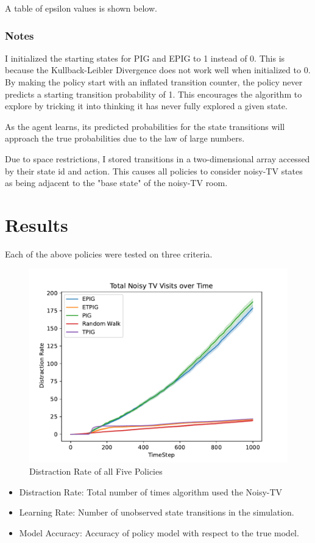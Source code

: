 \documentclass[12pt]{thesis}
\begin{document}
A table of epsilon values is shown below.
\subsection{Notes}
I initialized the starting states for PIG and EPIG to 1 instead of 0. This is because the Kullback-Leibler Divergence does not work well when initialized to 0. By making the policy start with an inflated transition counter, the policy never predicts a starting transition probability of 1. This encourages the algorithm to explore by tricking it into thinking it has never fully explored a given state.

As the agent learns, its predicted probabilities for the state transitions will approach the true probabilities due to the law of large numbers.

Due to space restrictions, I stored transitions in a two-dimensional array accessed by their state id and action. This causes all policies to consider noisy-TV states as being adjacent to the "base state" of the noisy-TV room.

\chapter{Results}
Each of the above policies were tested on three criteria.
\begin{figure}[b!]
	\begin{center}
	\includegraphics[scale=0.75]{"images/Distraction_Rate.pdf"}
	\end{center}
	\caption{Distraction Rate of all Five Policies}
	\label{Fig:DRFP}
\end{figure}
\begin{itemize}[]
	\item Distraction Rate: Total number of times algorithm used the Noisy-TV
	\item Learning Rate: Number of unobserved state transitions in the simulation.
	\item Model Accuracy: Accuracy of policy model with respect to the true model.
\end{itemize}
\end{document}
